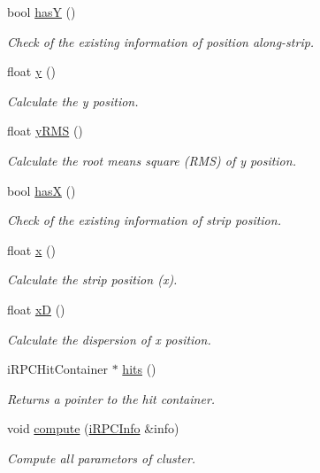 \begin{DoxyCompactItemize}
bool \hyperlink{classiRPCCluster_a3f38de656da42d2578bf0843d96e9d63}{has\-Y} ()
\begin{DoxyCompactList}\small\item\em Check of the existing information of position along-\/strip. \end{DoxyCompactList}\item 
float \hyperlink{classiRPCCluster_affb568c6f787e806345d89b03bbebe5d}{y} ()
\begin{DoxyCompactList}\small\item\em Calculate the y position. \end{DoxyCompactList}\item 
float \hyperlink{classiRPCCluster_ac7bed0a750f90d9176adf4a8281bca81}{y\-R\-M\-S} ()
\begin{DoxyCompactList}\small\item\em Calculate the root means square (R\-M\-S) of y position. \end{DoxyCompactList}\item 
bool \hyperlink{classiRPCCluster_af71fe5ff47681a8802eb9bb7a913b171}{has\-X} ()
\begin{DoxyCompactList}\small\item\em Check of the existing information of strip position. \end{DoxyCompactList}\item 
float \hyperlink{classiRPCCluster_aaaecb51b27bc79ce07ee51ab4d47ef26}{x} ()
\begin{DoxyCompactList}\small\item\em Calculate the strip position (x). \end{DoxyCompactList}\item 
float \hyperlink{classiRPCCluster_a8f1a80aa786afa5abc5a403a2a9c4533}{x\-D} ()
\begin{DoxyCompactList}\small\item\em Calculate the dispersion of x position. \end{DoxyCompactList}\item 
i\-R\-P\-C\-Hit\-Container $\ast$ \hyperlink{classiRPCCluster_a6702468c4a9549ea251436da07c4ce6e}{hits} ()
\begin{DoxyCompactList}\small\item\em Returns a pointer to the hit container. \end{DoxyCompactList}\item 
void \hyperlink{classiRPCCluster_a9092779c220e200a5675bbd31f733620}{compute} (\hyperlink{classiRPCInfo}{i\-R\-P\-C\-Info} \&info)
\begin{DoxyCompactList}\small\item\em Compute all parametors of cluster. \end{DoxyCompactList}\item 

\end{DoxyCompactItemize}
